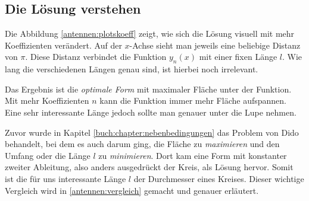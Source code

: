 \subsection{Die Lösung verstehen\label{antennen:auswertung}}

Die Abbildung \ref{antennen:plotskoeff} zeigt, wie sich die Lösung visuell mit mehr 
Koeffizienten verändert. Auf der $x$-Achse sieht man jeweils eine beliebige Distanz von \emph{$\pi$}.
Diese Distanz verbindet die Funktion $y_n(x)$ mit einer
fixen Länge $l$. Wie lang die verschiedenen Längen genau sind, ist hierbei noch irrelevant.

Das Ergebnis ist die \emph{optimale Form} mit
%
maximaler Fläche unter der Funktion. Mit mehr Koeffizienten $n$ kann die Funktion
immer mehr Fläche aufspannen. Eine sehr interessante Länge jedoch sollte man
genauer unter die Lupe nehmen. 

Zuvor wurde in Kapitel \ref{buch:chapter:nebenbedingungen} das Problem von Dido
%
%
behandelt, bei dem es auch darum ging, die Fläche zu \emph{maximieren} und den Umfang oder die Länge $l$ zu 
\emph{minimieren}. 
Dort kam eine Form mit konstanter zweiter Ableitung, also anders ausgedrückt
der Kreis, als Lösung hervor. Somit ist die für uns interessante Länge $l$ der Durchmesser eines Kreises. Dieser wichtige Vergleich wird in \ref{antennen:vergleich} gemacht und genauer erläutert.

